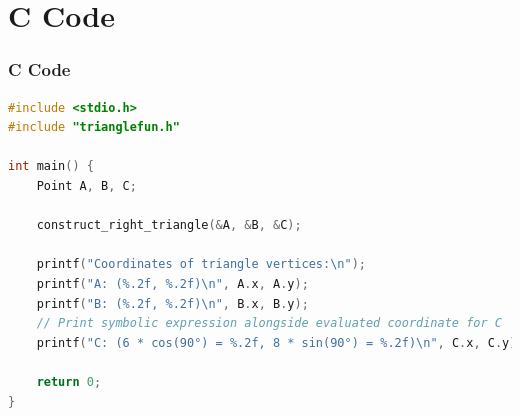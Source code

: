\documentclass{beamer}
\theoremstyle{remark}
\numberwithin{equation}{section}
\begin{document}
\section{ C Code}
\begin{frame}[fragile]
\frametitle{C Code }
\begin{lstlisting}[language=C]
#include <stdio.h>
#include "trianglefun.h"

int main() {
    Point A, B, C;

    construct_right_triangle(&A, &B, &C);

    printf("Coordinates of triangle vertices:\n");
    printf("A: (%.2f, %.2f)\n", A.x, A.y);
    printf("B: (%.2f, %.2f)\n", B.x, B.y);
    // Print symbolic expression alongside evaluated coordinate for C
    printf("C: (6 * cos(90°) = %.2f, 8 * sin(90°) = %.2f)\n", C.x, C.y);

    return 0;
}


    
\end{lstlisting}
\end{frame}
\end{document}
